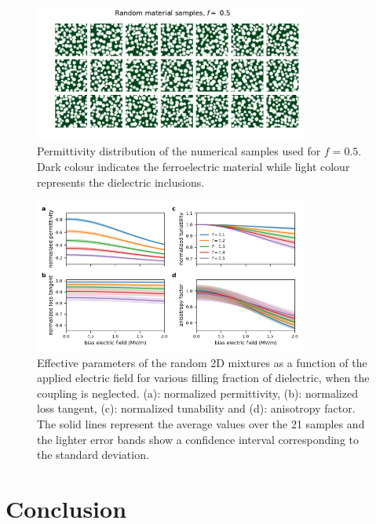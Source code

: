 \documentclass[%
 aip,
 amsmath,amssymb,
 reprint,%
linenumbers
]{revtex4-1}
\begin{document}
%
\begin{figure}[h!]
 \centering
 \includegraphics[width=0.8\textwidth]{random_samples_f_50percent}
 \caption{Permittivity distribution of the numerical samples used for $f=0.5$. Dark
  colour indicates the ferroelectric material while light colour represents the
  dielectric inclusions.}
 \label{randmatepsi}
\end{figure}


\begin{figure}[h!]
 \centering
 \includegraphics[width=0.8\textwidth]{effpar_rand_uncpl.png}
 \caption{Effective parameters of the random 2D mixtures as a function of the
  applied electric field for various filling fraction of dielectric, when the
  coupling is neglected.
  (a): normalized permittivity, (b): normalized loss tangent, (c): normalized tunability and
  (d): anisotropy factor. The solid lines represent the average values
  over the 21 samples and the lighter error bands show a confidence interval corresponding to
  the standard deviation.}
 \label{eff_par_2Drand_TM_uncpl}
\end{figure}
%
\section{Conclusion}
\end{document}
